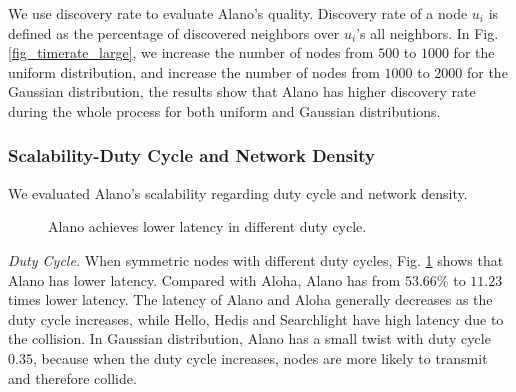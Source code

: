 We use discovery rate to evaluate Alano's quality.
Discovery rate of a node $u_i$ is defined as the percentage of discovered neighbors over $u_i$'s all neighbors.
In Fig. \ref{fig_timerate_large}, we increase the number of nodes from $500$ to $1000$ for the uniform distribution, and increase the number of nodes from $1000$ to $2000$ for the Gaussian distribution, the results show that Alano has higher discovery rate during the whole process for both uniform and Gaussian distributions. 





\subsubsection{Scalability-Duty Cycle and Network Density}

We evaluated Alano's scalability regarding duty cycle and network density.

\begin{figure}[!h]
\centering
{}
\hspace{0.01in}
\caption{Alano achieves lower latency in different duty cycle.}
\label{fig_dutycycle}
\end{figure}


\emph{Duty Cycle.}
When symmetric nodes with different duty cycles, Fig. \ref{fig_dutycycle} shows that Alano has lower latency. Compared with Aloha, Alano has from $53.66\%$ to $11.23$ times lower latency. The latency of Alano and Aloha generally decreases as the duty cycle increases, while Hello, Hedis and Searchlight have high latency due to the collision. In Gaussian distribution, Alano has a small twist with duty cycle $0.35$, because when the duty cycle increases, nodes are more likely to transmit and therefore collide.



